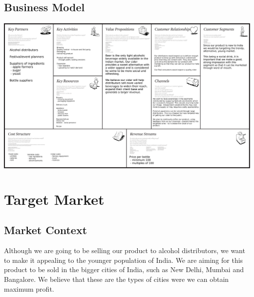 \documentclass[11pt]{article}
\begin{document}
  \newpage
  \subsection{Business Model}
  \includegraphics[angle=90,width=\textwidth,height=\textheight,keepaspectratio]{./business_model_canvas_poster.png}

\newpage
\section{Target Market}
  \subsection{Market Context}
		Although we are going to be selling our product to alcohol distributors,
		we want to make it appealing to the younger population of India. We are aiming
		for this product to be sold in the bigger cities of India, such as New Delhi,
		Mumbai and Bangalore. We believe that these are the types of cities were we can
		obtain maximum profit.
\end{document}
